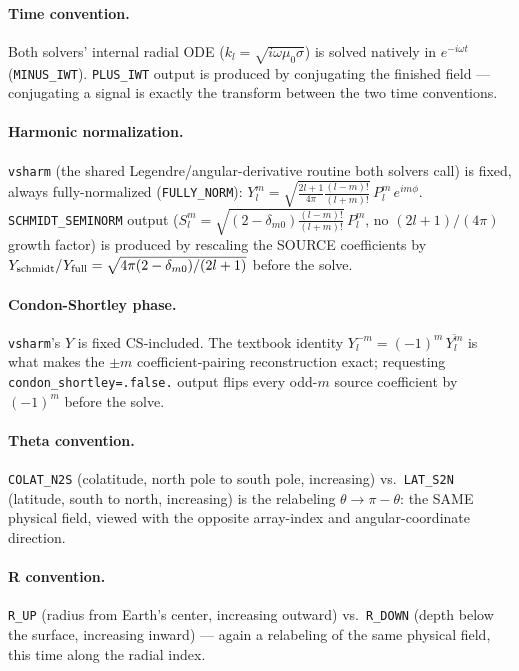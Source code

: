 \documentclass[11pt]{article}
\begin{document}
\paragraph{Time convention.} Both solvers' internal radial ODE ($k_l=\sqrt{i\omega\mu_0\sigma}$) is
solved natively in $e^{-i\omega t}$ (\texttt{MINUS\_IWT}). \texttt{PLUS\_IWT} output is produced by
conjugating the finished field --- conjugating a signal is exactly the transform between the two
time conventions.

\paragraph{Harmonic normalization.} \texttt{vsharm} (the shared Legendre/angular-derivative routine
both solvers call) is fixed, always fully-normalized (\texttt{FULLY\_NORM}):
$Y_l^m = \sqrt{\tfrac{2l+1}{4\pi}\tfrac{(l-m)!}{(l+m)!}}\,P_l^m\,e^{im\phi}$. \texttt{SCHMIDT\_SEMINORM}
output ($S_l^m = \sqrt{(2-\delta_{m0})\tfrac{(l-m)!}{(l+m)!}}\,P_l^m$, no $(2l+1)/(4\pi)$ growth
factor) is produced by rescaling the SOURCE coefficients by
$Y_{\rm schmidt}/Y_{\rm full}=\sqrt{4\pi(2-\delta_{m0})/(2l+1)}$ before the solve.

\paragraph{Condon-Shortley phase.} \texttt{vsharm}'s $Y$ is fixed CS-included. The textbook identity
$Y_l^{-m}=(-1)^m\,\overline{Y_l^m}$ is what makes the $\pm m$ coefficient-pairing reconstruction
exact; requesting \texttt{condon\_shortley=.false.} output flips every odd-$m$ source coefficient
by $(-1)^m$ before the solve.

\paragraph{Theta convention.} \texttt{COLAT\_N2S} (colatitude, north pole to south pole, increasing)
vs.\ \texttt{LAT\_S2N} (latitude, south to north, increasing) is the relabeling $\theta\to\pi-\theta$:
the SAME physical field, viewed with the opposite array-index and angular-coordinate direction.

\paragraph{R convention.} \texttt{R\_UP} (radius from Earth's center, increasing outward) vs.\
\texttt{R\_DOWN} (depth below the surface, increasing inward) --- again a relabeling of the same
physical field, this time along the radial index.
\end{document}
